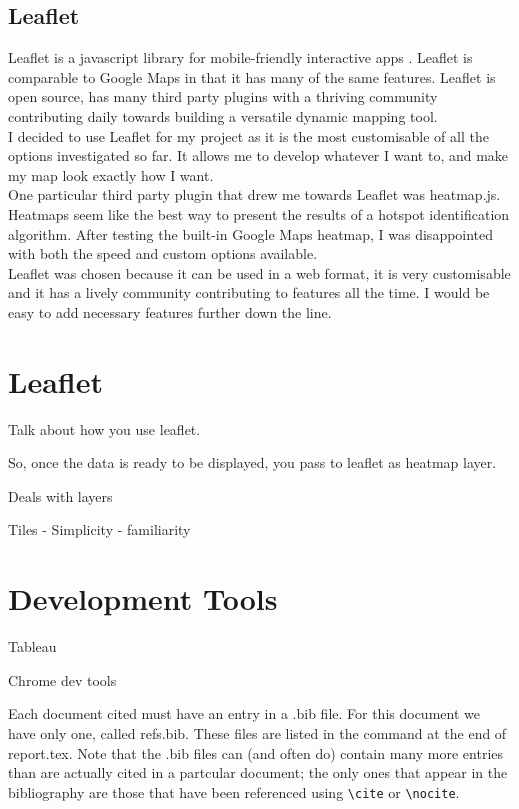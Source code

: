 \subsection{Leaflet}

Leaflet is a javascript library for mobile-friendly interactive apps \cite{leaflet}. Leaflet is comparable to Google Maps in that it has many of the same features. Leaflet is open source, has many third party plugins with a thriving community contributing daily towards building a versatile dynamic mapping tool.\\

I decided to use Leaflet for my project as it is the most customisable of all the options investigated so far. It allows me to develop whatever I want to, and make my map look exactly how I want.\\

One particular third party plugin that drew me towards Leaflet was heatmap.js. Heatmaps seem like the best way to present the results of a hotspot identification algorithm. After testing the built-in Google Maps heatmap, I was disappointed with both the speed and custom options available.\\

Leaflet was chosen because it can be used in a web format, it is very customisable and it has a lively community contributing to features all the time. I would be easy to add necessary features further down the line.

\section{Leaflet}

Talk about how you use leaflet.

So, once the data is ready to be displayed, you pass to leaflet as heatmap layer.

Deals with layers

Tiles - Simplicity - familiarity

\section{Development Tools}

Tableau

Chrome dev tools



Each document cited must have an entry in a \textsf{.bib} file. For this
document we have only one, called \textsf{refs.bib}. These files are
listed in the \verb== command at the end of
\textsf{report.tex}. Note that the \textsf{.bib} files can (and often
do) contain many more entries than are actually cited in a partcular
document; the only ones that appear in the bibliography are those that
have been referenced using \verb=\cite= or \verb=\nocite=.

